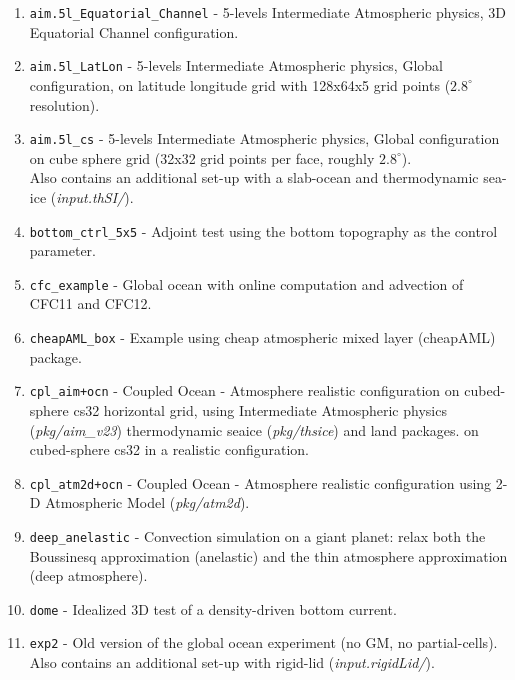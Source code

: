 \begin{enumerate}
\item \texttt{aim.5l\_Equatorial\_Channel} -
  5-levels Intermediate Atmospheric physics,
  3D Equatorial Channel configuration.

\item \texttt{aim.5l\_LatLon} - 5-levels Intermediate Atmospheric physics,
  Global configuration, on latitude longitude grid with 128x64x5 grid
  points ($2.8^\circ$ resolution).

\item \texttt{aim.5l\_cs} - 5-levels Intermediate Atmospheric physics,
  Global configuration on cube sphere grid
  (32x32 grid points per face, roughly $2.8^\circ$).\\
  Also contains an additional set-up with a slab-ocean and thermodynamic
  sea-ice ({\it input.thSI/}).

\item \texttt{bottom\_ctrl\_5x5} - Adjoint test using the bottom
  topography as the control parameter.

\item \texttt{cfc\_example} - Global ocean with online computation and
  advection of CFC11 and CFC12.

\item \texttt{cheapAML\_box} - Example using cheap atmospheric mixed layer
   (cheapAML) package.

\item \texttt{cpl\_aim+ocn} - Coupled Ocean - Atmosphere realistic
  configuration on cubed-sphere cs32 horizontal grid,
  using Intermediate Atmospheric physics ({\it pkg/aim\_v23})
  thermodynamic seaice ({\it pkg/thsice}) and land packages.
  on cubed-sphere cs32 in a realistic configuration.

\item \texttt{cpl\_atm2d+ocn} - Coupled Ocean - Atmosphere realistic
  configuration using 2-D Atmospheric Model ({\it pkg/atm2d}).

\item \texttt{deep\_anelastic} - Convection simulation on a giant planet:
  relax both the Boussinesq approximation (anelastic) and the thin atmosphere
  approximation (deep atmosphere).

\item \texttt{dome} - Idealized 3D test of a density-driven bottom current.

\item \texttt{exp2} - Old version of the global ocean experiment (no GM,
      no partial-cells).\\
  Also contains an additional set-up with rigid-lid ({\it input.rigidLid/}).


\end{enumerate}
